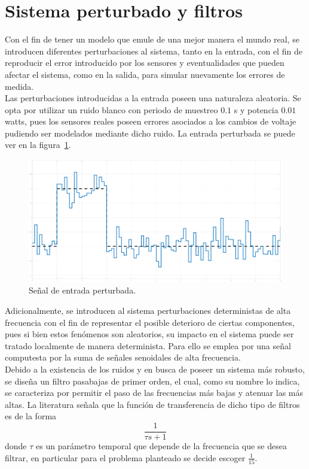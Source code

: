 \section{Sistema perturbado y filtros}
Con el fin de tener un modelo que emule de una mejor manera el mundo real,
se introducen diferentes perturbaciones al sistema, tanto en la
entrada, con el fin de reproducir el error introducido por los sensores
y eventualidades que pueden afectar el sistema, como en la salida, para simular nuevamente los errores de medida.\\

Las perturbaciones introducidas a la entrada poseen una naturaleza aleatoria. Se opta por utilizar un ruido blanco con periodo de
muestreo $0.1$ s y potencia $0.01$ watts, pues los sensores reales poseen errores
asociados a los cambios de voltaje pudiendo ser modelados mediante dicho ruido.
La entrada perturbada se puede ver en la figura~\ref{fig:entrada-ruido}.\\

\begin{figure}[t]
  \label{fig:entrada-ruido}
  \includegraphics[scale=0.15]{Figuras/entrada}
  \caption{Señal de entrada perturbada.} 
\end{figure}

Adicionalmente, se introducen al sistema perturbaciones deterministas
de alta frecuencia con el fin de representar el posible deterioro de ciertas
componentes, pues si bien estos fenómenos son aleatorios, su impacto en el sistema
puede ser tratado localmente de manera determinista. Para ello se emplea por una señal computesta por la suma de señales senoidales de alta frecuencia.\\

Debido a la existencia de los ruidos y en busca de poseer un sistema más robusto, se diseña un filtro pasabajas de primer orden,
el cual, como su nombre lo indica, se caracteriza por permitir el paso de las frecuencias
más bajas y atenuar las más altas. La literatura señala que la función de transferencia de dicho tipo de filtros
es de la forma~\cite{9780750300582}
\[
\frac{1}{\tau s + 1}
\]
donde $\tau $ es un parámetro temporal que depende de la frecuencia que se desea
filtrar, en particular para el problema planteado se decide escoger $\frac{1}{15}$.\\

